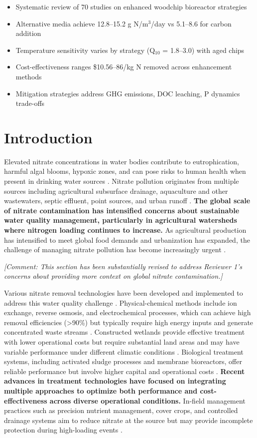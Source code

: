 \documentclass[12pt,a4paper]{article}
\newcommand{\added}[1]{\textcolor{addedtext}{\textbf{#1}}}
\newcommand{\comment}[1]{\textcolor{commenttext}{\textit{[Comment: #1]}}}
\begin{document}
\begin{itemize}[leftmargin=*, itemsep=0.2em]
\item Systematic review of 70 studies on enhanced woodchip bioreactor strategies
\item Alternative media achieve 12.8--15.2 g N/m$^3$/day vs 5.1--8.6 for carbon addition
\item Temperature sensitivity varies by strategy (Q$_{10}$ = 1.8--3.0) with aged chips
\item Cost-effectiveness ranges \$10.56--86/kg N removed across enhancement methods
\item Mitigation strategies address GHG emissions, DOC leaching, P dynamics trade-offs
\end{itemize}

\section{Introduction}

Elevated nitrate concentrations in water bodies contribute to eutrophication, harmful algal blooms, hypoxic zones, and can pose risks to human health when present in drinking water sources \citep{RN1181}. Nitrate pollution originates from multiple sources including agricultural subsurface drainage, aquaculture and other wastewaters, septic effluent, point sources, and urban runoff \citep{RN1181, RN310}. \added{The global scale of nitrate contamination has intensified concerns about sustainable water quality management, particularly in agricultural watersheds where nitrogen loading continues to increase.} As agricultural production has intensified to meet global food demands and urbanization has expanded, the challenge of managing nitrate pollution has become increasingly urgent \citep{RN312}.

\comment{This section has been substantially revised to address Reviewer 1's concerns about providing more context on global nitrate contamination.}

Various nitrate removal technologies have been developed and implemented to address this water quality challenge \citep{RN625, RN826}. Physical-chemical methods include ion exchange, reverse osmosis, and electrochemical processes, which can achieve high removal efficiencies (>90\%) but typically require high energy inputs and generate concentrated waste streams \citep{RN625}. Constructed wetlands provide effective treatment with lower operational costs but require substantial land areas and may have variable performance under different climatic conditions \citep{RN826}. Biological treatment systems, including activated sludge processes and membrane bioreactors, offer reliable performance but involve higher capital and operational costs \citep{RN625}. \added{Recent advances in treatment technologies have focused on integrating multiple approaches to optimize both performance and cost-effectiveness across diverse operational conditions.} In-field management practices such as precision nutrient management, cover crops, and controlled drainage systems aim to reduce nitrate at the source but may provide incomplete protection during high-loading events \citep{RN826}.
\end{document}
